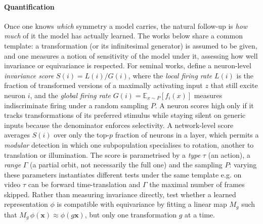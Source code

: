 \documentclass[mathematics,review,submit,moreauthors]{Definitions/mdpi}
\begin{document}
\paragraph{Quantification}
Once one knows \emph{which} symmetry a model carries, the natural follow-up is \emph{how much} of it the model has actually learned.
The works below share a common template: a transformation (or its infinitesimal generator) is assumed to be given, and one measures a notion of sensitivity of the model under it, assessing how well invariance or equivariance is respected.\newline
For seminal works, \citet{goodfellow2009anips} define a neuron-level \emph{invariance score} $S(i) = L(i)/G(i)$, where the \emph{local firing rate} $L(i)$ is the fraction of transformed versions of a maximally activating input $z$ that still excite neuron $i$, and the \emph{global firing rate} $G(i) = \mathbb{E}_{x\sim P}[f_i(x)]$ measures indiscriminate firing under a random sampling $P$.
A neuron scores high only if it tracks transformations of its preferred stimulus while staying silent on generic inputs because the denominator enforces selectivity.
A network-level score averages $S(i)$ over only the top-$p$ fraction of neurons in a layer, which permits a \emph{modular} detection in which one subpopulation specialises to rotation, another to translation or illumination.
The score is parametrised by a \emph{type} $\tau$ (an action), a \emph{range} $\Gamma$ (a partial orbit, not necessarily the full one) and the sampling $P$: varying these parameters instantiates different tests under the same template e.g. on video $\tau$ can be forward time-translation and $\Gamma$ the maximal number of frames skipped.
Rather than measuring invariance directly, \citet{lenc2014a} test whether a learned representation $\phi$ is compatible with equivariance by fitting a linear map $M_g$ such that $M_g\,\phi(\mathbf{x}) \approx \phi(g\mathbf{x})$, but only one transformation $g$ at a time.
\end{document}

